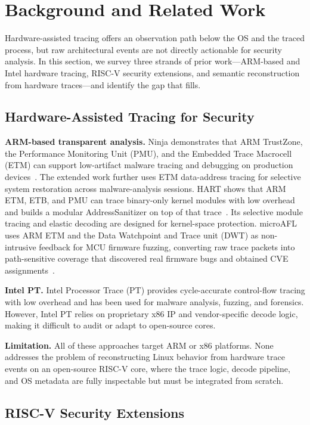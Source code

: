 \section{Background and Related Work}

Hardware-assisted tracing offers an observation path below the OS and the traced process, but raw architectural events are not directly actionable for security analysis. In this section, we survey three strands of prior work---ARM-based and Intel hardware tracing, RISC-V security extensions, and semantic reconstruction from hardware traces---and identify the gap that \rvmt fills.

\subsection{Hardware-Assisted Tracing for Security}

\textbf{ARM-based transparent analysis.} Ninja demonstrates that ARM TrustZone, the Performance Monitoring Unit (PMU), and the Embedded Trace Macrocell (ETM) can support low-artifact malware tracing and debugging on production devices~\cite{ning2017ninja,ning2019ninja}. The extended work further uses ETM data-address tracing for selective system restoration across malware-analysis sessions. HART shows that ARM ETM, ETB, and PMU can trace binary-only kernel modules with low overhead and builds a modular AddressSanitizer on top of that trace~\cite{hart2020esorics}. Its selective module tracing and elastic decoding are designed for kernel-space protection. microAFL uses ARM ETM and the Data Watchpoint and Trace unit (DWT) as non-intrusive feedback for MCU firmware fuzzing, converting raw trace packets into path-sensitive coverage that discovered real firmware bugs and obtained CVE assignments~\cite{microafl2022icse}.

\textbf{Intel PT.} Intel Processor Trace (PT) provides cycle-accurate control-flow tracing with low overhead and has been used for malware analysis, fuzzing, and forensics. However, Intel PT relies on proprietary x86 IP and vendor-specific decode logic, making it difficult to audit or adapt to open-source cores.

\textbf{Limitation.} All of these approaches target ARM or x86 platforms. None addresses the problem of reconstructing Linux behavior from hardware trace events on an open-source RISC-V core, where the trace logic, decode pipeline, and OS metadata are fully inspectable but must be integrated from scratch.

\subsection{RISC-V Security Extensions}

